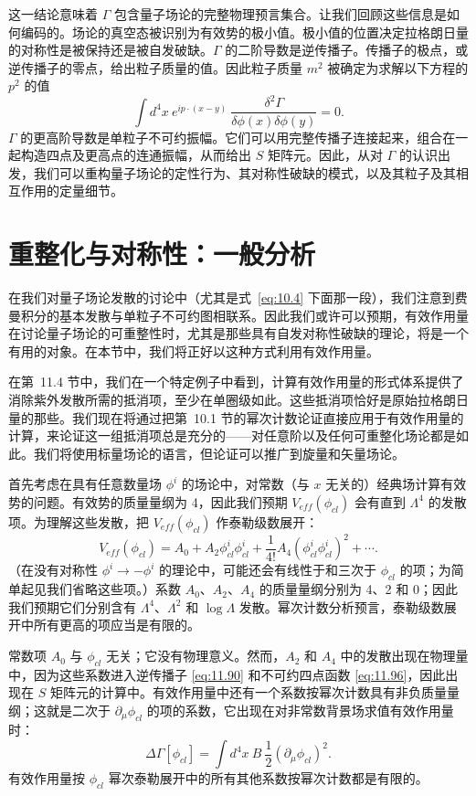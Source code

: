 这一结论意味着 $\Gamma$ 包含量子场论的完整物理预言集合。让我们回顾这些信息是如何编码的。场论的真空态被识别为有效势的极小值。极小值的位置决定拉格朗日量的对称性是被保持还是被自发破缺。$\Gamma$ 的二阶导数是逆传播子。传播子的极点，或逆传播子的零点，给出粒子质量的值。因此粒子质量 $m^2$ 被确定为求解以下方程的 $p^2$ 的值
\begin{equation}
  \int d^4x\ e^{ip\cdot(x-y)}\ \frac{\delta^2\Gamma}{\delta\phi(x)
    \delta\phi(y)} = 0 .
  \label{eq:11.97}
\end{equation}
$\Gamma$ 的更高阶导数是单粒子不可约振幅。它们可以用完整传播子连接起来，组合在一起构造四点及更高点的连通振幅，从而给出 $S$ 矩阵元。因此，从对 $\Gamma$ 的认识出发，我们可以重构量子场论的定性行为、其对称性破缺的模式，以及其粒子及其相互作用的定量细节。

\section{重整化与对称性：一般分析}

在我们对量子场论发散的讨论中（尤其是式~\eqref{eq:10.4} 下面那一段），我们注意到费曼积分的基本发散与单粒子不可约图相联系。因此我们或许可以预期，有效作用量在讨论量子场论的可重整性时，尤其是那些具有自发对称性破缺的理论，将是一个有用的对象。在本节中，我们将正好以这种方式利用有效作用量。

在第~11.4 节中，我们在一个特定例子中看到，计算有效作用量的形式体系提供了消除紫外发散所需的抵消项，至少在单圈级如此。这些抵消项恰好是原始拉格朗日量的那些。我们现在将通过把第~10.1 节的幂次计数论证直接应用于有效作用量的计算，来论证这一组抵消项总是充分的——对任意阶以及任何可重整化场论都是如此。我们将使用标量场论的语言，但论证可以推广到旋量和矢量场论。

首先考虑在具有任意数量场 $\phi^i$ 的场论中，对常数（与 $x$ 无关的）经典场计算有效势的问题。有效势的质量量纲为 4，因此我们预期 $V_{eff}(\phi_{cl})$ 会有直到 $\Lambda^4$ 的发散项。为理解这些发散，把 $V_{eff}(\phi_{cl})$ 作泰勒级数展开：
\begin{equation}
  V_{eff}(\phi_{cl}) = A_0 + A_2\phi_{cl}^i\phi_{cl}^i
    + \frac{1}{4!}A_4(\phi_{cl}^i\phi_{cl}^i)^2 + \cdots .
\end{equation}
（在没有对称性 $\phi^i\to-\phi^i$ 的理论中，可能还会有线性于和三次于 $\phi_{cl}$ 的项；为简单起见我们省略这些项。）系数 $A_0$、$A_2$、$A_4$ 的质量量纲分别为 4、2 和 0；因此我们预期它们分别含有 $\Lambda^4$、$\Lambda^2$ 和 $\log\Lambda$ 发散。幂次计数分析预言，泰勒级数展开中所有更高的项应当是有限的。

常数项 $A_0$ 与 $\phi_{cl}$ 无关；它没有物理意义。然而，$A_2$ 和 $A_4$ 中的发散出现在物理量中，因为这些系数进入逆传播子 \eqref{eq:11.90} 和不可约四点函数 \eqref{eq:11.96}，因此出现在 $S$ 矩阵元的计算中。有效作用量中还有一个系数按幂次计数具有非负质量量纲；这就是二次于 $\partial_\mu\phi_{cl}$ 的项的系数，它出现在对非常数背景场求值有效作用量时：
\begin{equation}
  \Delta\Gamma[\phi_{cl}] = \int d^4x\ B\ \frac{1}{2}(\partial_\mu\phi_{cl})^2 .
  \label{eq:11.98}
\end{equation}
有效作用量按 $\phi_{cl}$ 幂次泰勒展开中的所有其他系数按幂次计数都是有限的。

